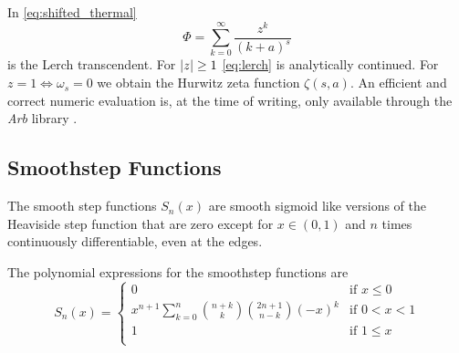 In \cref{eq:shifted_thermal}
\begin{equation}
  \label{eq:lerch}
  Φ=∑_{k=0}^{∞} \frac{z^{k}}{(k+a)^{s}}
\end{equation}
is the Lerch transcendent. For \(\abs{z} \geq 1\) \cref{eq:lerch} is
analytically continued. For \(z=1 \iff ω_{s}=0\) we obtain the Hurwitz
zeta function \(ζ(s, a)\). An efficient and correct numeric
evaluation is, at the time of writing, only available through the
\emph{Arb} library \cite{Johansson2017arb}.

\subsection{Smoothstep Functions}
\label{sec:smoothstep}
The smooth step functions \(S_{n}(x)\) are smooth sigmoid like
versions of the Heaviside step function that are zero except for
\(x\in (0,1)\) and \(n\) times continuously differentiable, even at
the edges.

The polynomial expressions for the smoothstep functions are
\begin{equation}
  \label{eq:smoothstep}
  {S} _{n}(x)={
    \begin{cases}
      0&{\text{if }}x\leq 0\\

      x^{n+1}∑_{k=0}^{n}{\binom {n+k}{k}}{\binom
      {2n+1}{n-k}}(-x)^{k} &{\text{if }}0 < x < 1\\1

       &{\text{if }}1\leq x\\
    \end{cases}}
\end{equation}
